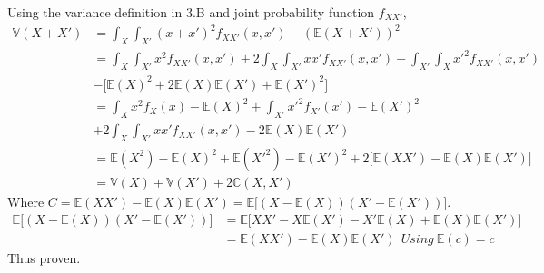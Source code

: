\documentclass{article}
\begin{document}
Using the variance definition in 3.B and joint probability function $f_{XX'}$,
\begin{align*}
    \mathbb{V}(X+X') &= \int_{X}\int_{X'}(x+x')^2f_{XX'}(x,x') - (\mathbb{E}(X+X'))^2\\
    &= \int_{X}\int_{X'} x^2 f_{XX'}(x,x') + 2 \int_{X}\int_{X'} x x' f_{XX'}(x,x') + \int_{X'}\int_{X} x'^2 f_{XX'}(x,x') \\ 
    &- \big[\mathbb{E}(X)^2 + 2\mathbb{E}(X)\mathbb{E}(X') + \mathbb{E}(X')^2\big]\\
    &= \int_{X} x^2 f_{X}(x) - \mathbb{E}(X)^2 + \int_{X'} x'^2 f_{X'}(x') - \mathbb{E}(X')^2 \\
    &+ 2 \int_{X}\int_{X'} x x' f_{XX'}(x,x') - 2\mathbb{E}(X)\mathbb{E}(X')\\
    &=  \mathbb{E}(X^2) - \mathbb{E}(X)^2 + \mathbb{E}(X'^2) - \mathbb{E}(X')^2 + 2 \big[ \mathbb{E}(XX') - \mathbb{E}(X)\mathbb{E}(X')\big]\\
    &= \mathbb{V}(X) + \mathbb{V}(X') + 2\mathbb{C}(X,X')
\end{align*}
Where $C = \mathbb{E}(XX') - \mathbb{E}(X)\mathbb{E}(X') = \mathbb{E}\big[(X-\mathbb{E}(X))(X'-\mathbb{E}(X'))\big]$.
\begin{align*}
    \mathbb{E}\big[(X-\mathbb{E}(X))(X'-\mathbb{E}(X'))\big] &= \mathbb{E}\big[XX'-X \mathbb{E}(X')-X' \mathbb{E}(X) +\mathbb{E}(X)\mathbb{E}(X') \big]\\
    &= \mathbb{E}(XX')- \mathbb{E}(X)\mathbb{E}(X') \ \ Using\ \mathbb{E}(c) = c
\end{align*}
Thus proven.
\end{document}
